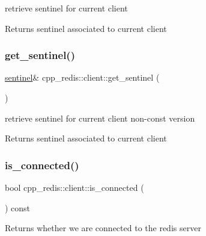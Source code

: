 retrieve sentinel for current client

\begin{DoxyReturn}{Returns}
sentinel associated to current client 
\end{DoxyReturn}
\mbox{\label{classcpp__redis_1_1client_a2fa17b8fbc245a190389d95083857cc4}} 
\subsubsection{\texorpdfstring{get\+\_\+sentinel()}{get\_sentinel()}\hspace{0.1cm}{\footnotesize\ttfamily [2/2]}}
{\footnotesize\ttfamily \mbox{\hyperlink{classcpp__redis_1_1sentinel}{sentinel}}\& cpp\+\_\+redis\+::client\+::get\+\_\+sentinel (\begin{DoxyParamCaption}{ }\end{DoxyParamCaption})}

retrieve sentinel for current client non-\/const version

\begin{DoxyReturn}{Returns}
sentinel associated to current client 
\end{DoxyReturn}
\mbox{\label{classcpp__redis_1_1client_a378682dda2753feff4c174679bd0f9d5}} 
\subsubsection{\texorpdfstring{is\+\_\+connected()}{is\_connected()}}
{\footnotesize\ttfamily bool cpp\+\_\+redis\+::client\+::is\+\_\+connected (\begin{DoxyParamCaption}{ }\end{DoxyParamCaption}) const}

\begin{DoxyReturn}{Returns}
whether we are connected to the redis server 
\end{DoxyReturn}
\mbox{\label{classcpp__redis_1_1client_ada3dc63edcf04c7db8ffa027bbe85da8}} 
